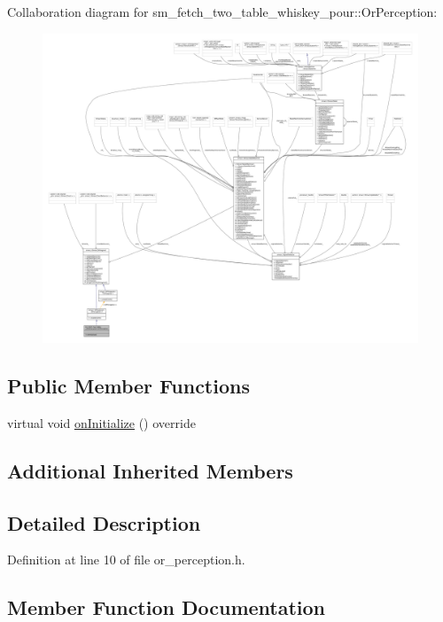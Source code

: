 Collaboration diagram for sm\+\_\+fetch\+\_\+two\+\_\+table\+\_\+whiskey\+\_\+pour\+:\+:Or\+Perception\+:
\nopagebreak
\begin{figure}[H]
\begin{center}
\leavevmode
\includegraphics[width=350pt]{classsm__fetch__two__table__whiskey__pour_1_1OrPerception__coll__graph}
\end{center}
\end{figure}
\subsection*{Public Member Functions}
\begin{DoxyCompactItemize}
\item 
virtual void \hyperlink{classsm__fetch__two__table__whiskey__pour_1_1OrPerception_a0b3a159df93b90888fdac1d56032fcc7}{on\+Initialize} () override
\end{DoxyCompactItemize}
\subsection*{Additional Inherited Members}


\subsection{Detailed Description}


Definition at line 10 of file or\+\_\+perception.\+h.



\subsection{Member Function Documentation}
\mbox{\label{classsm__fetch__two__table__whiskey__pour_1_1OrPerception_a0b3a159df93b90888fdac1d56032fcc7}} 

